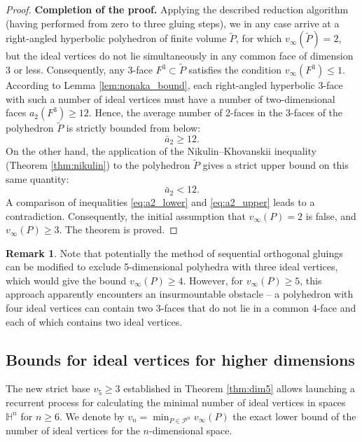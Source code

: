 \documentclass[12pt]{amsart}
\theoremstyle{definition}
\newtheorem{remark}{Remark}[section]
\begin{document}
\begin{proof}
		\textbf{Completion of the proof.} 
		Applying the described reduction algorithm (having performed from zero to three gluing steps), we in any case arrive at a right-angled hyperbolic polyhedron of finite volume $\tilde{P}$, for which $v_\infty(\tilde{P}) = 2$, but the ideal vertices do not lie simultaneously in any common face of dimension 3 or less. Consequently, any 3-face $F^3 \subset \tilde{P}$ satisfies the condition $v_\infty(F^3) \le 1$. According to Lemma \ref{lem:nonaka_bound}, each right-angled hyperbolic 3-face with such a number of ideal vertices must have a number of two-dimensional faces $a_2(F^3) \ge 12$. Hence, the average number of 2-faces in the 3-faces of the polyhedron $\tilde{P}$ is strictly bounded from below:
		\begin{equation} \label{eq:a2_lower}
			\bar{a}_2 \ge 12.
		\end{equation}
		On the other hand, the application of the Nikulin--Khovanskii inequality (Theorem \ref{thm:nikulin}) to the polyhedron $\tilde{P}$ gives a strict upper bound on this same quantity:
		\begin{equation} \label{eq:a2_upper}
			\bar{a}_2 < 12.
		\end{equation}
		A comparison of inequalities \eqref{eq:a2_lower} and \eqref{eq:a2_upper} leads to a contradiction. Consequently, the initial assumption that $v_\infty(P) = 2$ is false, and $v_\infty(P) \ge 3$. The theorem is proved.
	\end{proof}
	
	\begin{remark}
		Note that potentially the method of sequential orthogonal gluings can be modified to exclude 5-dimensional polyhedra with three ideal vertices, which would give the bound $v_\infty(P) \ge 4$. However, for $v_\infty(P) \ge 5$, this approach apparently encounters an insurmountable obstacle -- a polyhedron with four ideal vertices can contain two 3-faces that do not lie in a common 4-face and each of which contains two ideal vertices.
	\end{remark}
	
	\subsection{Bounds for ideal vertices for higher dimensions}
	
	The new strict base $v_5 \ge 3$ established in Theorem \ref{thm:dim5} allows launching a recurrent process for calculating the minimal number of ideal vertices in spaces $\mathbb{H}^n$ for $n \ge 6$. We denote by $v_n = \min_{P \in \mathcal{P}^n} v_\infty(P)$ the exact lower bound of the number of ideal vertices for the $n$-dimensional space.
	
\end{document}
